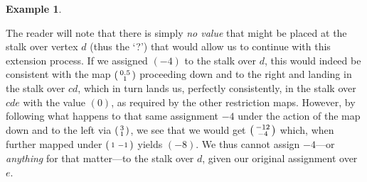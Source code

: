 \documentclass[11pt]{book}
\theoremstyle{definition}
\newtheorem{example}{Example}[section]
\theoremstyle{definition}
\theoremstyle{definition}
\theoremstyle{theorem}
\theoremstyle{definition}
\begin{document}
\begin{example}
\begin{center}
		\end{center}
		The reader will note that there is simply \textit{no value} that might be placed at the stalk over vertex $d$ (thus the `?') that would allow us to continue with this extension process. If we assigned $(-4)$ to the stalk over $d$, this would indeed be consistent with the map $\begin{psmallmatrix}
		0.5 \\ 1 \end{psmallmatrix}$ proceeding down and to the right and landing in the stalk over $cd$, which in turn lands us, perfectly consistently, in the stalk over $cde$ with the value $(0)$, as required by the other restriction maps. However, by following what happens to that same assignment $-4$ under the action of the map down and to the left via $\begin{psmallmatrix} 3 \\ 1 \end{psmallmatrix}$, we see that we would get $\begin{psmallmatrix}
		-12 \\ -4 \end{psmallmatrix}$ which, when further mapped under $\begin{psmallmatrix}
		1 & -1 \end{psmallmatrix}$ yields $(-8)$. We thus cannot assign $-4$---or \textit{anything} for that matter---to the stalk over $d$, given our original assignment over $e$. \par 

\end{example}
\end{document}
